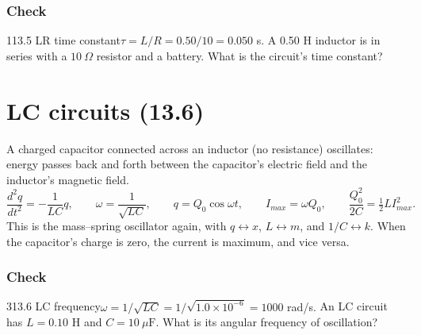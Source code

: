 \documentclass[11pt]{article}
\begin{document}
\subsubsection{Check}\mbox{}

\begin{q}{1}{13.5 LR time constant}{$\tau = L/R = 0.50/10 = 0.050$ s.}
A 0.50 H inductor is in series with a $10\ \Omega$ resistor and a battery. What is the circuit's time constant?
\end{q}

\section{LC circuits (13.6)}\label{sec:5}

A charged capacitor connected across an inductor (no resistance) oscillates: energy passes back and forth between the capacitor's electric field and the inductor's magnetic field.
\[ \frac{d^2q}{dt^2} = -\frac{1}{LC}q, \qquad \omega = \frac{1}{\sqrt{LC}}, \qquad q = Q_0\cos\omega t, \qquad I_{max} = \omega Q_0, \qquad \frac{Q_0^2}{2C} = \tfrac12 LI_{max}^2. \]
This is the mass--spring oscillator again, with $q \leftrightarrow x$, $L \leftrightarrow m$, and $1/C \leftrightarrow k$. When the capacitor's charge is zero, the current is maximum, and vice versa.

\subsubsection{Check}\mbox{}

\begin{q}{3}{13.6 LC frequency}{$\omega = 1/\sqrt{LC} = 1/\sqrt{1.0\times10^{-6}} = 1000$ rad/s.}
An LC circuit has $L = 0.10$ H and $C = 10\ \mu\mathrm{F}$. What is its angular frequency of oscillation?
\end{q}

\makekey
\end{document}
